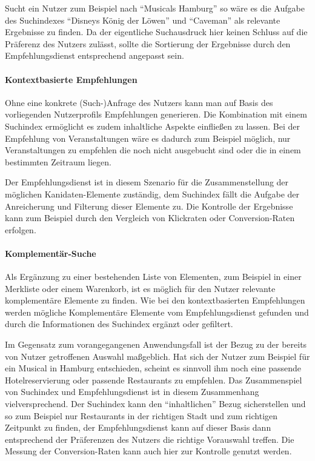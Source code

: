 Sucht ein Nutzer zum Beispiel nach ``Musicals Hamburg'' so wäre es die Aufgabe des Suchindexes ``Disneys König der Löwen'' und ``Caveman'' als relevante Ergebnisse zu finden. Da der eigentliche Suchausdruck hier keinen Schluss auf die Präferenz des Nutzers zulässt, sollte die Sortierung der Ergebnisse durch den Empfehlungsdienst entsprechend angepasst sein.


\paragraph{Kontextbasierte Empfehlungen} Ohne eine konkrete (Such-)Anfrage des Nutzers kann man auf Basis des vorliegenden Nutzerprofils Empfehlungen generieren.  Die Kombination mit einem Suchindex ermöglicht es zudem inhaltliche Aspekte einfließen zu lassen. Bei der Empfehlung von Veranstaltungen wäre es dadurch zum Beispiel möglich, nur Veranstaltungen zu empfehlen die noch nicht ausgebucht sind oder die in einem bestimmten Zeitraum liegen.

Der Empfehlungsdienst ist in diesem Szenario für die Zusammenstellung der möglichen Kanidaten-Elemente zuständig, dem Suchindex fällt die Aufgabe der Anreicherung und Filterung dieser Elemente zu. Die Kontrolle der Ergebnisse kann zum Beispiel durch den Vergleich von Klickraten oder Conversion-Raten erfolgen.

\paragraph{Komplementär-Suche} Als Ergänzung zu einer bestehenden Liste von Elementen, zum Beispiel in einer Merkliste oder einem Warenkorb, ist es möglich für den Nutzer relevante komplementäre Elemente zu finden. Wie bei den kontextbasierten Empfehlungen werden mögliche Komplementäre Elemente vom Empfehlungsdienst gefunden und durch die Informationen des Suchindex ergänzt oder gefiltert.

Im Gegensatz zum vorangegangenen Anwendungsfall ist der Bezug zu der bereits von Nutzer getroffenen Auswahl maßgeblich. Hat sich der Nutzer zum Beispiel für ein Musical in Hamburg entschieden, scheint es sinnvoll ihm noch eine passende Hotelreservierung oder passende Restaurants zu empfehlen. Das Zusammenspiel von Suchindex und Empfehlungsdienst ist in diesem Zusammenhang vielversprechend. Der Suchindex kann den ``inhaltlichen'' Bezug sicherstellen und so zum Beispiel nur Restaurants in der richtigen Stadt und zum richtigen Zeitpunkt zu finden, der Empfehlungsdienst kann auf dieser Basis dann entsprechend der Präferenzen des Nutzers die richtige Vorauswahl treffen. Die Messung der Conversion-Raten kann auch hier zur Kontrolle genutzt werden.

